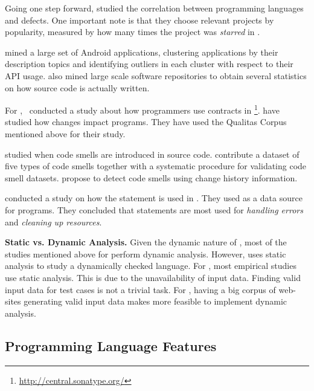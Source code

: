 Going one step forward, \cite{rayLargescaleStudyProgramming2017} studied the correlation between programming languages and defects. 
One important note is that they choose relevant projects by popularity,
measured by how many times the project was \emph{starred} in \github{}.

\cite{gorlaCheckingAppBehavior2014} mined a large set of Android applications, clustering applications by their description topics and identifying outliers in each cluster with respect to their API usage.
\cite{grechanikEmpiricalInvestigationLargescale2010} also mined large scale software repositories to obtain several statistics on how source code is actually written.

For \java{},~\cite{dietrichContractsWildStudy2017a} conducted a study
about how programmers use contracts in \mavencentral{}\footnote{\url{http://central.sonatype.org/}}.
\cite{dietrichBrokenPromisesEmpirical2014} have studied how
\api{} changes impact \java{} programs.
They have used the Qualitas Corpus~\citep{temperoQualitasCorpusCurated2010} mentioned above for their study.

\cite{tufanoWhenWhyYour2015,tufanoWhenWhyYour2017} studied when code
smells are introduced in source code.
\cite{palombaLandfillOpenDataset2015}
contribute a dataset of five types of code smells together with a systematic procedure for validating code smell datasets.
\cite{palombaDetectingBadSmells2013} propose to detect code smells using change history information.

\cite{nagappanEmpiricalStudyGoto2015} conducted a study on how the
 statement is used in \cc{}.
They used \github{} as a data source for \cc{} programs.
They concluded that  statements are most used for
\emph{handling errors} and \emph{cleaning up resources}.

\textbf{Static vs. Dynamic Analysis.}
Given the dynamic nature of \javascript, most of the studies mentioned
above for \javascript{} perform dynamic analysis.
However, \cite{callauHowWhyDevelopers2013} uses static analysis to study
a dynamically checked language.
For \java{}, most empirical studies use static analysis.
This is due to the unavailability of input data.
Finding valid input data for test cases is not a trivial task.
For \javascript{}, having a big corpus of web-sites generating valid
input data makes more feasible to implement dynamic analysis.

\subsection*{Programming Language Features}

